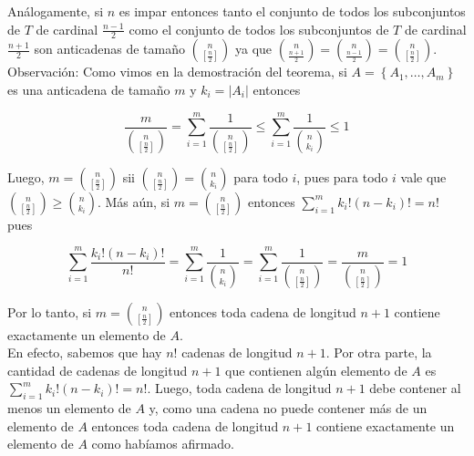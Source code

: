 \documentclass[10pt]{article}
\begin{document}
Análogamente, si $n$ es impar entonces tanto el conjunto de todos los subconjuntos de $T$ de cardinal $\frac{n-1}{2}$ como el conjunto de todos los subconjuntos de $T$ de cardinal $\frac{n+1}{2}$ son anticadenas de tamaño $\binom{n}{\left[\frac{n}{2}\right]}$ ya que $\binom{n}{\frac{n+1}{2}}=\binom{n}{\frac{n-1}{2}}=\binom{n}{\left[\frac{n}{2}\right]}$.\\
Observación: Como vimos en la demostración del teorema, si $A=\left\{A_{1}, \ldots, A_{m}\right\}$ es una anticadena de tamaño $m$ y $k_{i}=\left|A_{i}\right|$ entonces

$$
\frac{m}{\binom{n}{\left[\frac{n}{2}\right]}}=\sum_{i=1}^{m} \frac{1}{\binom{n}{\left[\frac{n}{2}\right]}} \leq \sum_{i=1}^{m} \frac{1}{\binom{n}{k_{i}}} \leq 1
$$

Luego, $m=\binom{n}{\left[\frac{n}{2}\right]}$ sii $\binom{n}{\left[\frac{n}{2}\right]}=\binom{n}{k_{i}}$ para todo $i$, pues para todo $i$ vale que $\binom{n}{\left[\frac{n}{2}\right]} \geq\binom{ n}{k_{i}}$. Más aún, si $m=\binom{n}{\left[\frac{n}{2}\right]}$ entonces $\sum_{i=1}^{m} k_{i}!\left(n-k_{i}\right)!=n!$ pues

$$
\sum_{i=1}^{m} \frac{k_{i}!\left(n-k_{i}\right)!}{n!}=\sum_{i=1}^{m} \frac{1}{\binom{n}{k_{i}}}=\sum_{i=1}^{m} \frac{1}{\binom{n}{\left[\frac{n}{2}\right]}}=\frac{m}{\binom{n}{\left[\frac{n}{2}\right]}}=1
$$

Por lo tanto, si $m=\binom{n}{\left[\frac{n}{2}\right]}$ entonces toda cadena de longitud $n+1$ contiene exactamente un elemento de $A$.\\
En efecto, sabemos que hay $n!$ cadenas de longitud $n+1$. Por otra parte, la cantidad de cadenas de longitud $n+1$ que contienen algún elemento de $A$ es $\sum_{i=1}^{m} k_{i}!\left(n-k_{i}\right)!=n!$. Luego, toda cadena de longitud $n+1$ debe contener al menos un elemento de $A$ y, como una cadena no puede contener más de un elemento de $A$ entonces toda cadena de longitud $n+1$ contiene exactamente un elemento de $A$ como habíamos afirmado.
\end{document}
